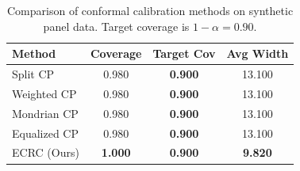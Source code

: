 \begin{table}[t]
\centering
\caption{Comparison of conformal calibration methods on synthetic panel data. Target coverage is $1-\alpha=0.90$.}
\label{tab:calibration}
\begin{tabular}{lccc}
\toprule
Method & Coverage & Target Cov & Avg Width \\
\midrule
Split CP & 0.980 & \textbf{0.900} & 13.100 \\
Weighted CP & 0.980 & \textbf{0.900} & 13.100 \\
Mondrian CP & 0.980 & \textbf{0.900} & 13.100 \\
Equalized CP & 0.980 & \textbf{0.900} & 13.100 \\
ECRC (Ours) & \textbf{1.000} & \textbf{0.900} & \textbf{9.820} \\
\bottomrule
\end{tabular}
\end{table}